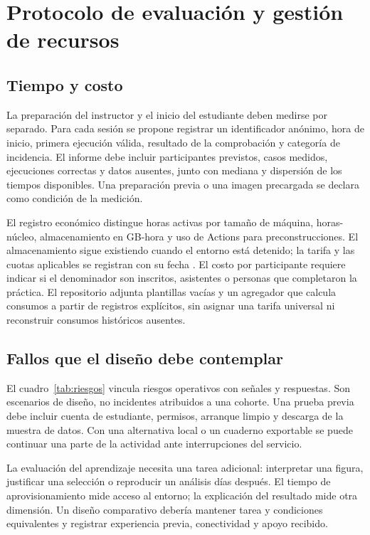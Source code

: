 \section{Protocolo de evaluación y gestión de recursos}
\subsection{Tiempo y costo}
La preparación del instructor y el inicio del estudiante deben medirse por separado. Para cada sesión se propone registrar un identificador anónimo, hora de inicio, primera ejecución válida, resultado de la comprobación y categoría de incidencia. El informe debe incluir participantes previstos, casos medidos, ejecuciones correctas y datos ausentes, junto con mediana y dispersión de los tiempos disponibles. Una preparación previa o una imagen precargada se declara como condición de la medición.

El registro económico distingue horas activas por tamaño de máquina, horas-núcleo, almacenamiento en GB-hora y uso de Actions para preconstrucciones. El almacenamiento sigue existiendo cuando el entorno está detenido; la tarifa y las cuotas aplicables se registran con su fecha \cite{billing}. El costo por participante requiere indicar si el denominador son inscritos, asistentes o personas que completaron la práctica. El repositorio adjunta plantillas vacías y un agregador que calcula consumos a partir de registros explícitos, sin asignar una tarifa universal ni reconstruir consumos históricos ausentes.

\subsection{Fallos que el diseño debe contemplar}
El cuadro~\ref{tab:riesgos} vincula riesgos operativos con señales y respuestas. Son escenarios de diseño, no incidentes atribuidos a una cohorte. Una prueba previa debe incluir cuenta de estudiante, permisos, arranque limpio y descarga de la muestra de datos. Con una alternativa local o un cuaderno exportable se puede continuar una parte de la actividad ante interrupciones del servicio.



La evaluación del aprendizaje necesita una tarea adicional: interpretar una figura, justificar una selección o reproducir un análisis días después. El tiempo de aprovisionamiento mide acceso al entorno; la explicación del resultado mide otra dimensión. Un diseño comparativo debería mantener tarea y condiciones equivalentes y registrar experiencia previa, conectividad y apoyo recibido.

